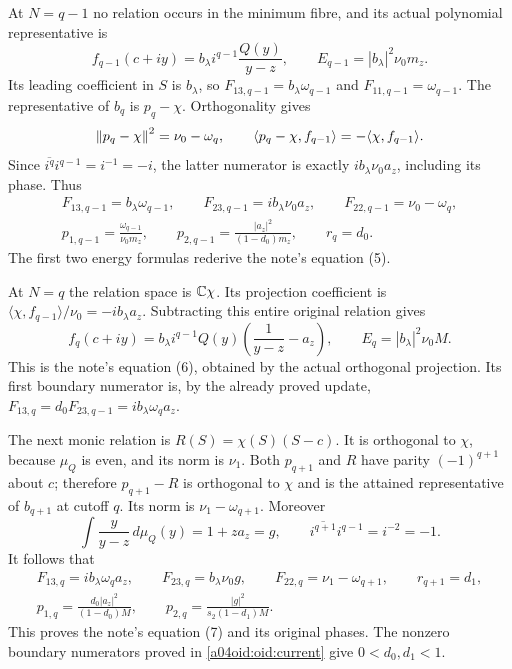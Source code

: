 At $N=q-1$ no relation occurs in the minimum fibre, and its actual
polynomial representative is
\[
 f_{q-1}(c+iy)=b_\lambda i^{q-1}\frac{Q(y)}{y-z},\qquad
 E_{q-1}=|b_\lambda|^2\nu_0m_z.
\]
Its leading coefficient in $S$ is $b_\lambda$, so
$F_{13,q-1}=b_\lambda\omega_{q-1}$ and
$F_{11,q-1}=\omega_{q-1}$. The representative of $b_q$ is
$p_q-\chi$. Orthogonality gives
\[
 \left\lVert p_q-\chi\right\rVert^2=\nu_0-\omega_q,
 \qquad
 \langle p_q-\chi,f_{q-1}\rangle=-\langle\chi,f_{q-1}\rangle.
\]
Since $\overline{i^q}i^{q-1}=i^{-1}=-i$, the latter numerator is
exactly $i b_\lambda\nu_0a_z$, including its phase. Thus
\begin{equation}\label{a04oid:oid:lowfirst}
 \begin{gathered}
 F_{13,q-1}=b_\lambda\omega_{q-1},\qquad
 F_{23,q-1}=i b_\lambda\nu_0a_z,\qquad
 F_{22,q-1}=\nu_0-\omega_q,\\
 p_{1,q-1}=\frac{\omega_{q-1}}{\nu_0m_z},\qquad
 p_{2,q-1}=\frac{|a_z|^2}{(1-d_0)m_z},\qquad
 r_q=d_0.
 \end{gathered}
\end{equation}
The first two energy formulas rederive the note's equation (5).

At $N=q$ the relation space is $\mathbb C\chi$.
Its projection coefficient is
$\langle\chi,f_{q-1}\rangle/\nu_0=-i b_\lambda a_z$.
Subtracting this entire original relation gives
\begin{equation}\label{a04oid:oid:lowsecondlift}
 f_q(c+iy)=b_\lambda i^{q-1}Q(y)
 \left(\frac1{y-z}-a_z\right),\qquad
 E_q=|b_\lambda|^2\nu_0M.
\end{equation}
This is the note's equation (6), obtained by the actual orthogonal
projection. Its first boundary numerator is, by the already proved
update, $F_{13,q}=d_0F_{23,q-1}=i b_\lambda\omega_q a_z$.

The next monic relation is $R(S)=\chi(S)(S-c)$.
It is orthogonal to $\chi$, because $\mu_Q$ is even, and its norm
is $\nu_1$. Both $p_{q+1}$ and $R$ have parity $(-1)^{q+1}$
about $c$; therefore $p_{q+1}-R$ is orthogonal to $\chi$ and is
the attained representative of $b_{q+1}$ at cutoff $q$.
Its norm is $\nu_1-\omega_{q+1}$. Moreover
\[
 \int\frac{y}{y-z}\,d\mu_Q(y)=1+za_z=g,\qquad
 \overline{i^{q+1}}i^{q-1}=i^{-2}=-1.
\]
It follows that
\begin{equation}\label{a04oid:oid:lowsecond}
\begin{gathered}
 F_{13,q}=i b_\lambda\omega_q a_z,\qquad
 F_{23,q}=b_\lambda\nu_0g,\qquad
 F_{22,q}=\nu_1-\omega_{q+1},\qquad r_{q+1}=d_1,\\
 p_{1,q}=\frac{d_0|a_z|^2}{(1-d_0)M},\qquad
 p_{2,q}=\frac{|g|^2}{s_2(1-d_1)M}.
\end{gathered}
\end{equation}
This proves the note's equation (7) and its original phases. The
nonzero boundary numerators proved in \eqref{a04oid:oid:current} give
$0<d_0,d_1<1$.


